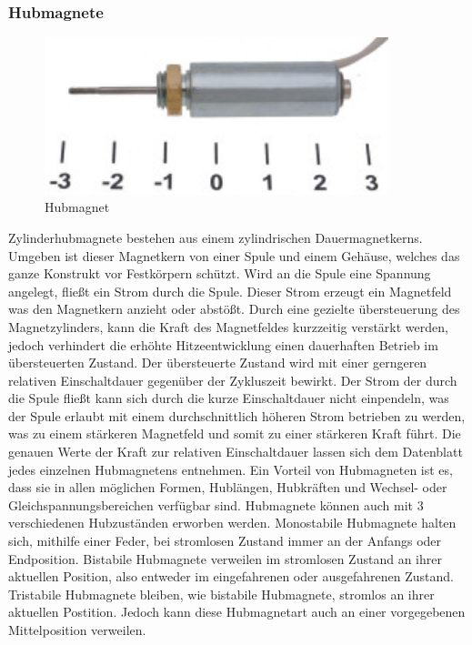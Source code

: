 \subsubsection{Hubmagnete}
\begin{figure}[H] 
\begin{center}

\includegraphics[width=10cm]{Bilder/Bauteile/Hubmagnet}
\caption{Hubmagnet}
\label{Hubmagnet}

\end{center}
\end{figure}
Zylinderhubmagnete bestehen aus einem zylindrischen Dauermagnetkerns. Umgeben ist dieser Magnetkern von einer Spule und einem Gehäuse, welches das ganze Konstrukt vor Festkörpern schützt. Wird an die Spule eine Spannung angelegt, fließt ein Strom durch die Spule. Dieser Strom erzeugt ein Magnetfeld was den Magnetkern anzieht oder abstößt. Durch eine gezielte übersteuerung des Magnetzylinders, kann die Kraft des Magnetfeldes kurzzeitig verstärkt werden, jedoch verhindert die erhöhte Hitzeentwicklung einen dauerhaften Betrieb im übersteuerten Zustand. Der übersteuerte Zustand wird mit einer gerngeren relativen Einschaltdauer gegenüber der Zykluszeit bewirkt. Der Strom der durch die Spule fließt kann sich durch die kurze Einschaltdauer nicht einpendeln, was der Spule erlaubt mit einem durchschnittlich höheren Strom betrieben zu werden, was zu einem stärkeren Magnetfeld und somit zu einer stärkeren Kraft führt. Die genauen Werte der Kraft zur relativen Einschaltdauer lassen sich dem Datenblatt jedes einzelnen Hubmagnetens entnehmen. Ein Vorteil von Hubmagneten ist es, dass sie in allen möglichen Formen, Hublängen, Hubkräften und Wechsel- oder Gleichspannungsbereichen verfügbar sind. Hubmagnete können auch mit 3 verschiedenen Hubzuständen erworben werden. Monostabile Hubmagnete halten sich, mithilfe einer Feder, bei stromlosen Zustand immer an der Anfangs oder Endposition. Bistabile Hubmagnete verweilen im stromlosen Zustand an ihrer aktuellen Position, also entweder im eingefahrenen oder ausgefahrenen Zustand. Tristabile Hubmagnete bleiben, wie bistabile Hubmagnete, stromlos an ihrer aktuellen Postition. Jedoch kann diese Hubmagnetart auch an einer vorgegebenen Mittelposition verweilen.

